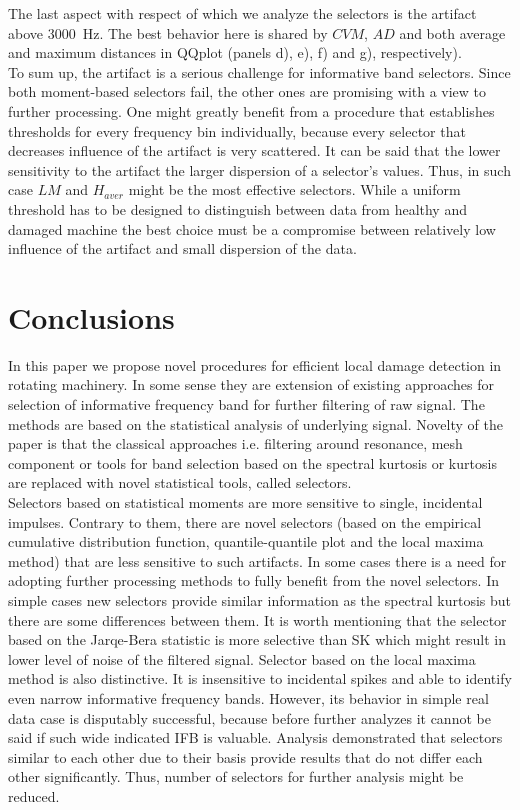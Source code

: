 \documentclass[3p,times]{elsarticle}
\begin{document}
The last aspect with respect of which we analyze the selectors is the artifact above 3000~Hz. The best behavior here is shared by $CVM$, $AD$ and both average and maximum distances in QQplot (panels d), e), f) and g), respectively).\\
To sum up, the artifact is a serious challenge for informative band selectors. Since both moment-based selectors fail, the other ones are promising with a view to further processing. One might greatly benefit from a procedure that establishes thresholds for every frequency bin individually, because every selector that decreases influence of the artifact is very scattered. It can be said that the lower sensitivity to the artifact the larger dispersion of a selector's values. Thus, in such case $LM$ and $H_{aver}$ might be the most effective selectors. While a uniform threshold has to be designed to distinguish between data from healthy and damaged machine the best choice must be a compromise between relatively low influence of the artifact and small dispersion of the data.
\section{Conclusions}
In this paper we propose novel procedures for efficient local damage detection in rotating machinery. In some sense they are extension of existing approaches for selection of informative frequency band for further filtering of raw signal. The methods are based on the statistical analysis of underlying signal. Novelty of the paper is that the classical approaches i.e. filtering around resonance, mesh component or tools for band selection based on the spectral kurtosis or kurtosis~\cite{bib01,bib22} are replaced with novel statistical tools, called selectors.\\
Selectors based on statistical moments are more sensitive to single, incidental impulses. Contrary to them, there are novel selectors (based on the empirical cumulative distribution function, quantile-quantile plot and the local maxima method) that are less sensitive to such artifacts. In some cases there is a need for adopting further processing methods to fully benefit from the novel selectors. In simple cases new selectors provide similar information as the spectral kurtosis but there are some differences between them. It is worth mentioning that the selector based on the Jarqe-Bera statistic is more selective than SK which might result in lower level of noise of the filtered signal. Selector based on the local maxima method is also distinctive. It is insensitive to incidental spikes and able to identify even narrow informative frequency bands. However, its behavior in simple real data case is disputably successful, because before further analyzes it cannot be said if such wide indicated IFB is valuable. Analysis demonstrated that selectors similar to each other due to their basis provide results that do not differ each other significantly. Thus, number of selectors for further analysis might be reduced.
\end{document}
